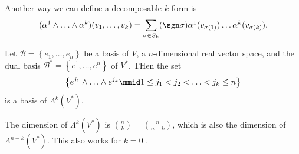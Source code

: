 \documentclass[notoc,notitlepage]{tufte-book}
\begin{document}
\begin{propo}\label{propo:alternate_definition_of_a_decomposable_k_form}
  Another way we can define a decomposable $k$-form is
  \begin{equation*}
    (\alpha^1 \land \hdots \land \alpha^k)(v_1, \ldots, v_k)
    = \sum_{\sigma \in S_k} (\sgn \sigma) \alpha^1 (v_{\sigma(1)}) \hdots \alpha^k (v_{\sigma(k)}).
  \end{equation*}
\end{propo}

\begin{thm}\label{thm:basis_of_lambda_k_v_}
  Let $\mathcal{B} = \left\{ e_1, \ldots, e_n \right\}$ be a basis of $V$, a $n$-dimensional
  real vector space, and the dual basis $\mathcal{B}^* = \left\{ e^1, \ldots, e^n \right\}$
  of $V^*$. THen the set
  \begin{equation*}
    \left\{ e^{j_1} \land \ldots \land e^{j_k} \mmid 1 \leq j_1 < j_2 < \hdots < j_k \leq n \right\}
  \end{equation*}
  is a basis of $\Lambda^k(V^*)$.
\end{thm}

\begin{crly}\label{crly:dimension_of_lambda_k_v_}
  The dimension of $\Lambda^k(V^*)$ is $\binom{n}{k} = \binom{n}{n - k}$, which is
  also the dimension of $\Lambda^{n - k}(V^*)$. This also works for $k = 0$ .
\end{crly}
\end{document}

